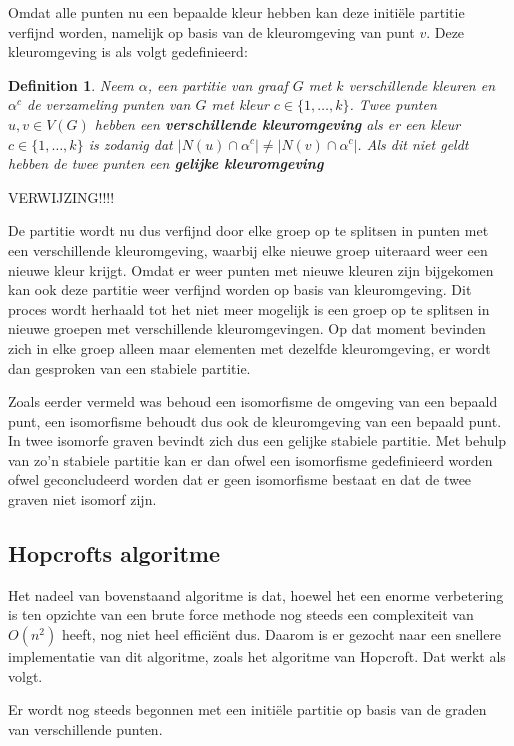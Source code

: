 \documentclass[twoside]{article}
\newtheorem{definition}{Definition}[section]
\begin{document}
\begin{multicols}{2}
Omdat alle punten nu een bepaalde kleur hebben kan deze initi\"ele partitie verfijnd worden, namelijk op basis van de kleuromgeving van punt $v$. Deze kleuromgeving is als volgt gedefinieerd:

\begin{definition}
Neem $\alpha$, een partitie van graaf $G$ met $k$ verschillende kleuren en  $\alpha^{c}$ de verzameling punten van $G$ met kleur $c \in \{1,\ldots,k\}$. Twee punten $u,v \in V(G)$ hebben een \textbf{verschillende kleuromgeving} als er een kleur $c \in \{1,\ldots,k\}$ is zodanig dat $|N(u)\cap\alpha^{c}| \neq |N(v)\cap\alpha^{c}|$. Als dit niet geldt hebben de twee punten een \textbf{gelijke kleuromgeving}
\end{definition}
VERWIJZING!!!!

De partitie wordt nu dus verfijnd door elke groep op te splitsen in punten met een verschillende kleuromgeving, waarbij elke nieuwe groep uiteraard weer een nieuwe kleur krijgt. Omdat er weer punten met nieuwe kleuren zijn bijgekomen kan ook deze partitie weer verfijnd worden op basis van kleuromgeving. Dit proces wordt herhaald tot het niet meer mogelijk is een groep op te splitsen in nieuwe groepen met verschillende kleuromgevingen. Op dat moment bevinden zich in elke groep alleen maar elementen met dezelfde kleuromgeving, er wordt dan gesproken van een stabiele partitie.

Zoals eerder vermeld was behoud een isomorfisme de omgeving van een bepaald punt, een isomorfisme behoudt dus ook de kleuromgeving van een bepaald punt. In twee isomorfe graven bevindt zich dus een gelijke stabiele partitie. Met behulp van zo'n stabiele partitie kan er dan ofwel een isomorfisme gedefinieerd worden ofwel geconcludeerd worden dat er geen isomorfisme bestaat en dat de twee graven niet isomorf zijn.

\subsection{Hopcrofts algoritme}
Het nadeel van bovenstaand algoritme is dat, hoewel het een enorme verbetering is ten opzichte van een brute force methode nog steeds een complexiteit van $O(n^2)$ heeft, nog niet heel effici\"ent dus. Daarom is er gezocht naar een snellere implementatie van dit algoritme, zoals het algoritme van Hopcroft. Dat werkt als volgt.


Er wordt nog steeds begonnen met een initi\"ele partitie op basis van de graden van verschillende punten.


\end{multicols}
\end{document}

